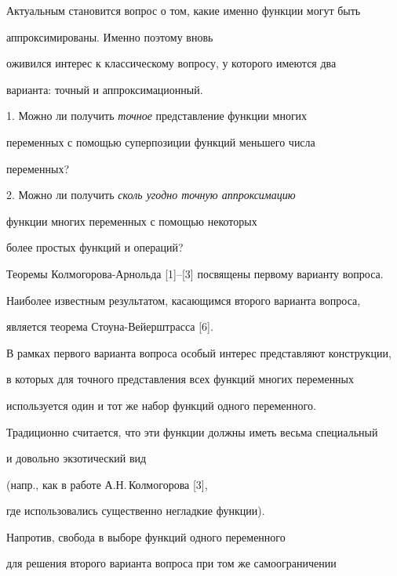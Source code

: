 Актуальным становится вопрос о том, какие именно функции могут быть


аппроксимированы. Именно поэтому вновь


оживился интерес к классическому вопросу, у которого имеются два


варианта: точный и аппроксимационный.


\medskip





1. Можно ли получить {\it точное} представление функции многих


переменных с помощью суперпозиции функций меньшего числа


переменных?





2. Можно ли получить {\it сколь угодно точную аппроксимацию}


функции многих переменных с помощью некоторых


более простых функций и операций?


\medskip





Теоремы Колмогорова-Арнольда [1]--[3] посвящены первому варианту вопроса.


Наиболее известным результатом, касающимся второго варианта вопроса,


является теорема Стоуна-Вейерштрасса [6].





В рамках первого варианта вопроса особый интерес представляют конструкции,


в которых для точного представления всех функций многих переменных


используется один и тот же набор функций одного переменного.


Традиционно считается, что эти функции должны иметь весьма специальный


и довольно экзотический вид


(напр., как в работе А.Н.\,Колмогорова [3],


где использовались существенно негладкие функции).





Напротив, свобода в выборе функций одного переменного


для решения второго варианта вопроса при том же самоограничении


